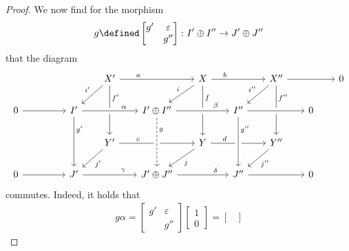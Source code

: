 \begin{proof}
  We now find for the morphism
  \[
    g
    \defined
    \begin{bmatrix}
      g'  & \varepsilon \\
          & g''
    \end{bmatrix}
    \colon
    I' \oplus I''
    \to
    J' \oplus J''
  \]
  that the diagram
  \[
    \begin{tikzcd}[column sep = 1.8em]
        {}
      & {}
      & {}
      & X'
        \arrow{rr}[above, near start]{a}
        \arrow{dl}[above left]{i'}
        \arrow{dd}[right, near start]{f'}
      & {}
      & X
        \arrow{rr}[above, near start]{b}
        \arrow{dl}[above left]{i}
        \arrow{dd}[right, near start]{f}
      & {}
      & X''
        \arrow{rr}
        \arrow{dl}[above left]{i''}
        \arrow{dd}[right, near start]{f''}
      & {}
      & 0
      \\
        0
        \arrow{rr}
      & {}
      & I'
        \arrow{dd}[right, near start]{g'}
      & {}
      & I' \oplus I''
        \arrow[from=ll, crossing over, "\alpha", near end]
      & {}
      & I''
        \arrow[from=ll, crossing over, "\beta", near end]
      & {}
      & 0
        \arrow[from=ll, crossing over]
      & {}
      \\
        {}
      & {}
      & {}
      & Y'
        \arrow{rr}[above, near start]{c}
        \arrow{dl}[below right]{j'}
      & {}
      & Y
        \arrow{rr}[above, near start]{d}
        \arrow{dl}[below right]{j}
      & {}
      & Y''
        \arrow{dl}[below right]{j''}
      & {}
      & {}
      \\
        0
        \arrow{rr}
      & {}
      & J'
        \arrow{rr}[above, near end]{\gamma}
      & {}
      & J' \oplus J''
        \arrow[dashed, from=uu, crossing over, "g", near start]
        \arrow{rr}[above, near end]{\delta}
      & {}
      & J''
        \arrow[from=uu, crossing over, "g''", near start]
        \arrow{rr}
      & {}
      & 0
      & {}
    \end{tikzcd}
  \]
  commutes.
  Indeed, it holds that
  \begin{gather*}
    g \alpha
    =
    \begin{bmatrix}
      g'  & \varepsilon \\
          & g''
    \end{bmatrix}
    \begin{bmatrix}
      1 \\
      0
    \end{bmatrix}
    =
    \begin{bmatrix}

\end{bmatrix}
\end{gather*}
\end{proof}
